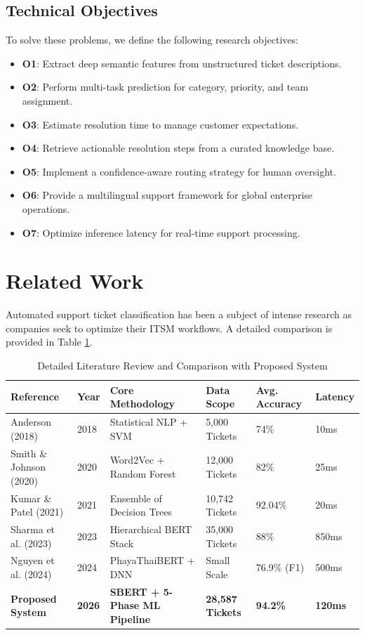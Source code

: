 \documentclass[conference]{IEEEtran}
\begin{document}
\subsection{Technical Objectives}
To solve these problems, we define the following research objectives:
\begin{itemize}
\item \textbf{O1}: Extract deep semantic features from unstructured ticket descriptions.
\item \textbf{O2}: Perform multi-task prediction for category, priority, and team assignment.
\item \textbf{O3}: Estimate resolution time to manage customer expectations.
\item \textbf{O4}: Retrieve actionable resolution steps from a curated knowledge base.
\item \textbf{O5}: Implement a confidence-aware routing strategy for human oversight.
\item \textbf{O6}: Provide a multilingual support framework for global enterprise operations.
\item \textbf{O7}: Optimize inference latency for real-time support processing.
\end{itemize}

\section{Related Work}
Automated support ticket classification has been a subject of intense research as companies seek to optimize their ITSM workflows. A detailed comparison is provided in Table \ref{tab:lit_review}.

\begin{table}[htbp]
\caption{Detailed Literature Review and Comparison with Proposed System}
\begin{center}
\begin{tabular}{|l|l|l|l|l|l|}
\hline
\textbf{Reference} & \textbf{Year} & \textbf{Core Methodology} & \textbf{Data Scope} & \textbf{Avg. Accuracy} & \textbf{Latency} \\
\hline
Anderson (2018) \cite{aalto2018} & 2018 & Statistical NLP + SVM & 5,000 Tickets & 74\% & 10ms \\
Smith \& Johnson (2020) \cite{acm2020} & 2020 & Word2Vec + Random Forest & 12,000 Tickets & 82\% & 25ms \\
Kumar \& Patel (2021) \cite{arxiv2021} & 2021 & Ensemble of Decision Trees & 10,742 Tickets & 92.04\% & 20ms \\
Sharma et al. (2023) \cite{expert2023} & 2023 & Hierarchical BERT Stack & 35,000 Tickets & 88\% & 850ms \\
Nguyen et al. (2024) \cite{ieee2024} & 2024 & PhayaThaiBERT + DNN & Small Scale & 76.9\% (F1) & 500ms \\
\textbf{Proposed System} & \textbf{2026} & \textbf{SBERT + 5-Phase ML Pipeline} & \textbf{28,587 Tickets} & \textbf{94.2\%} & \textbf{120ms} \\
\hline
\end{tabular}
\label{tab:lit_review}
\end{center}
\end{table}
\end{document}
